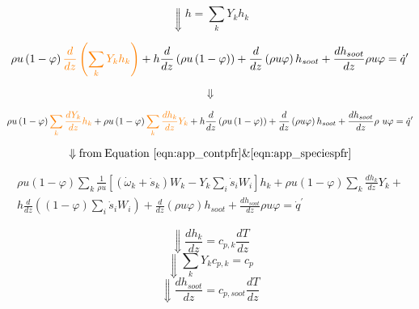 \begin{equation*}
	\Downarrow h=\sum_{k}{Y_kh_k}
\end{equation*}

\begin{equation*}
	\rho u\left(1-\varphi\right)
	\color{orange}
	\frac{d}{dz}\left(
	\sum_{k}{Y_k h_k}\right)
	\color{black}
	+
	h
	\frac{d}{dz}\left(\rho u\left(1-\varphi\right)\right)
	+
	\frac{d}{dz}\left(\rho u\varphi\right)h_{soot}+\frac{dh_{soot}}{dz}\rho u\varphi={\dot{q}}^\prime
\end{equation*}

\begin{equation*}
	\Downarrow
\end{equation*}

\begin{equation*}
	\rho u\left(1-\varphi\right)
	\color{orange}\sum_{k}{\frac{dY_k}{dz}h_k}
	\color{black}
	+
	\rho u\left(1-\varphi\right)
	\color{orange}\sum_{k}{\frac{dh_k}{dz}Y_k}
	\color{black}
	+
	h\frac{d}{dz}\left(\rho u\left(1-\varphi\right)\right)
	+
	\color{black}
	\frac{d}{dz}\left(\rho u\varphi\right)h_{soot}+\frac{dh_{soot}}{dz}\rho\ u\varphi={\dot{q}}^\prime
\end{equation*}


\begin{equation*}
	\Downarrow \mathrm{from \: Equation~\eqref{eqn:app_contpfr} \& \eqref{eqn:app_speciespfr}}
\end{equation*}


\begin{equation*}
	\begin{split}
	\rho 
	u\left(1-\varphi\right)
	\sum_{k}
	{\frac{1}{\rho u}
	\left[
		({\dot{\omega}}_k+{\dot{s}}_k)W_k-Y_k\sum_{i}{{\dot{s}}_iW_i}
	\right]h_k}
	+
	\rho u\left(1-\varphi\right)\sum_{k}{\frac{dh_k}{dz}Y_k}
	+ \\
	h\frac{d}{dz}
	\left(
		(1-\varphi)\sum_{i}{{\dot{s}}_iW_i}
	\right)
	+\frac{d}{dz}\left(\rho u\varphi\right)h_{soot}
	+
	\frac{dh_{soot}}{dz}\rho u\varphi={\dot{q}}^\prime
	\end{split}	
\end{equation*}

\begin{equation*}
	\Downarrow \frac{dh_k}{dz} = c_{p,k} \frac{dT}{dz}
\end{equation*}
\begin{equation*}
	\Downarrow \sum_{k} Y_k c_{p,k} = c_p
\end{equation*}
\begin{equation*}
	\Downarrow \frac{dh_{soot}}{dz} = c_{p,soot} \frac{dT}{dz}
\end{equation*}

